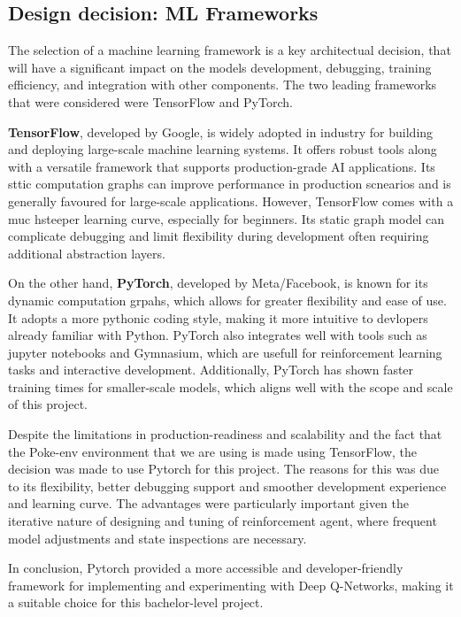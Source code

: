 \subsection{Design decision: ML Frameworks}
The selection of a machine learning framework is a key architectual decision, that
will have a significant impact on the models development, debugging, training efficiency,
and integration with other components. The two leading frameworks that were considered were
TensorFlow and PyTorch. 

\textbf{TensorFlow}, developed by Google, is widely adopted in industry for building 
and deploying large-scale machine learning systems. It offers robust tools along with
a versatile framework that supports production-grade AI applications. Its sttic computation
graphs can improve performance in production scnearios and is generally favoured for 
large-scale applications. However, TensorFlow comes with a muc hsteeper learning curve,
especially for beginners. Its static graph model can complicate debugging and 
limit flexibility during development often requiring additional abstraction layers.

On the other hand, \textbf{PyTorch}, developed by Meta/Facebook, is known for its dynamic
computation grpahs, which allows for greater flexibility and ease of use. It adopts a
more pythonic coding style, making it more intuitive to devlopers already familiar with
Python. PyTorch also integrates well with tools such as jupyter notebooks and Gymnasium,
which are usefull for reinforcement learning tasks and interactive development. Additionally,
PyTorch has shown faster training times for smaller-scale models, which aligns well with
the scope and scale of this project.

Despite the limitations in production-readiness and scalability and the fact that the
Poke-env environment that we are using is made using TensorFlow, the decision was made
to use Pytorch for this project. The reasons for this was due to its flexibility, better
debugging support and smoother development experience and learning curve. The advantages
were particularly important given the iterative nature of designing and tuning of reinforcement
agent, where frequent model adjustments and state inspections are necessary. 

In conclusion, Pytorch provided a more accessible and developer-friendly framework for
implementing and experimenting with Deep Q-Networks, making it a suitable choice for this
bachelor-level project.


